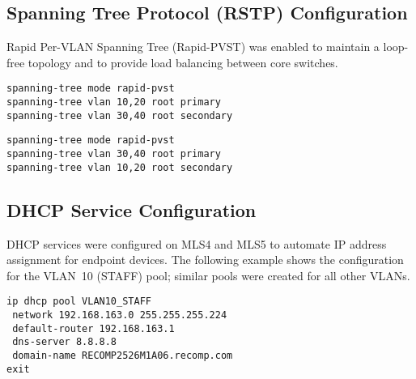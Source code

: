 \subsection{Spanning Tree Protocol (RSTP) Configuration}

Rapid Per-VLAN Spanning Tree (Rapid-PVST) was enabled to maintain a loop-free topology and to provide load balancing between core switches.

\begin{lstlisting}[caption={RSTP configuration on MLS4}, label={lst:warsaw-rstp-mls4}]
spanning-tree mode rapid-pvst
spanning-tree vlan 10,20 root primary
spanning-tree vlan 30,40 root secondary
\end{lstlisting}

\begin{lstlisting}[caption={RSTP configuration on MLS5}, label={lst:warsaw-rstp-mls5}]
spanning-tree mode rapid-pvst
spanning-tree vlan 30,40 root primary
spanning-tree vlan 10,20 root secondary
\end{lstlisting}

\subsection{DHCP Service Configuration}

DHCP services were configured on MLS4 and MLS5 to automate IP address assignment for endpoint devices.  
The following example shows the configuration for the VLAN~10 (STAFF) pool; similar pools were created for all other VLANs.

\begin{lstlisting}[caption={DHCP configuration for VLAN10 on MLS4/MLS5}, label={lst:warsaw-dhcp}]
ip dhcp pool VLAN10_STAFF
 network 192.168.163.0 255.255.255.224
 default-router 192.168.163.1
 dns-server 8.8.8.8
 domain-name RECOMP2526M1A06.recomp.com
exit
\end{lstlisting}

